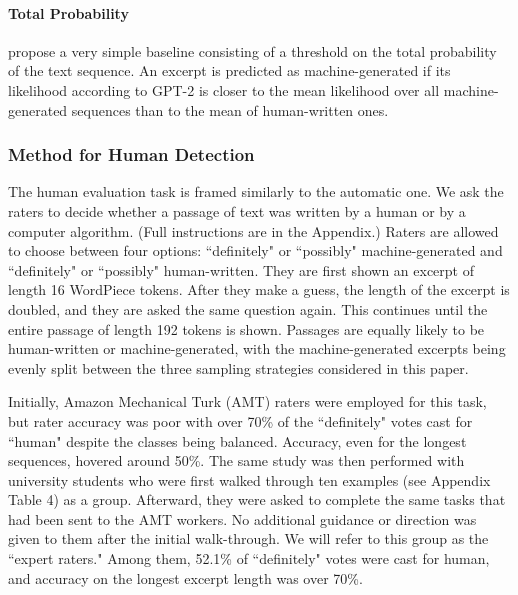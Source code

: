 \paragraph{Total Probability}
\citet{solaiman2019release} propose a very simple baseline consisting of a threshold on the total probability of the text sequence.
An excerpt is predicted as machine-generated if its likelihood according to GPT-2 is closer to the mean likelihood over all machine-generated sequences than to the mean of human-written ones.

\subsubsection{Method for Human Detection}
The human evaluation task is framed similarly to the automatic one.
We ask the raters to decide whether a passage of text was written by a human or by a computer algorithm. (Full instructions are in the Appendix.)
Raters are allowed to choose between four options: ``definitely" or ``possibly" machine-generated and  ``definitely" or ``possibly" human-written.
They are first shown an excerpt of length 16 WordPiece tokens.
After they make a guess, the length of the excerpt is doubled, and they are asked the same question again.
This continues until the entire passage of length 192 tokens is shown.
Passages are equally likely to be human-written or machine-generated, with the machine-generated excerpts being evenly split between the three sampling strategies considered in this paper.

Initially, Amazon Mechanical Turk (AMT) raters were employed for this task, but rater accuracy was poor with over 70\% of the ``definitely" votes cast for ``human" despite the classes being balanced.
Accuracy, even for the longest sequences, hovered around 50\%.
The same study was then performed with university students who were first walked through ten examples (see Appendix Table 4) as a group.
Afterward, they were asked to complete the same tasks that had been sent to the AMT workers.
No additional guidance or direction was given to them after the initial walk-through.
We will refer to this group as the ``expert raters."
Among them, 52.1\% of ``definitely" votes were cast for human, and accuracy on the longest excerpt length was over 70\%.

